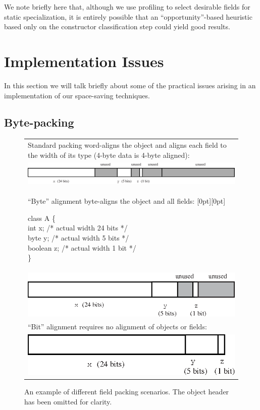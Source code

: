 \documentclass{acmconf}
\begin{document}
We note briefly here that, although we use profiling to select desirable
fields for static specialization, it is entirely possible that an
``opportunity''-based heuristic based only on the constructor
classification step could yield good results.

\section{Implementation Issues}

In this section we will talk briefly about some of the practical
issues arising in an implementation of our space-saving techniques.

\subsection{Byte-packing}

\begin{figure}
\centering
\begin{tabular}{|l|}
\hline
Standard packing word-aligns the object and aligns each field to the
width of its type (4-byte data is 4-byte aligned):\\
\includegraphics[scale=0.7]{Figures/standardAlignment.eps}\\
``Byte'' alignment byte-aligns the object and all fields:
\hfill\raisebox{-1ex}[0pt][0pt]{\parbox[t]{3in}{
\begin{samplecode}
class A \{\\
\>int x;  /* actual width 24 bits */\\
\>byte y; /* actual width 5 bits */\\
\>boolean z; /* actual width 1 bit */\\
\}\\
\end{samplecode}
}}\\
\includegraphics[scale=0.7]{Figures/byteAlignment.eps}\\
``Bit'' alignment requires no alignment of objects or fields:\\
\includegraphics[scale=0.7]{Figures/bitAlignment.eps}\\
\hline
\end{tabular}
\caption{An example of different field packing scenarios.  The object
  header has been omitted for clarity.}
\label{fig:packing}
\end{figure}
\end{document}
